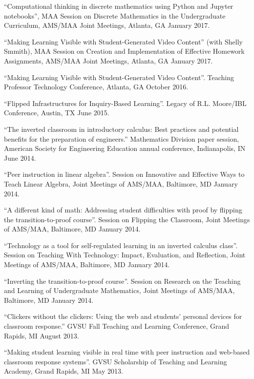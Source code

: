\documentclass[letterpaper]{article}
\renewenvironment{itemize}{
  \begin{list}{}{
    \setlength{\leftmargin}{1.5em}
	\setlength{\itemsep}{0in}
  }
}{
  \end{list}
}
\begin{document}
\begin{itemize}
  \item ``Computational thinking in discrete mathematics using Python and Jupyter notebooks'', MAA Session on Discrete Mathematics in the Undergraduate Curriculum, AMS/MAA Joint Meetings, Atlanta, GA January 2017.
  \item ``Making Learning Visible with Student-Generated Video Content'' (with Shelly Smmith), MAA Session on Creation and Implementation of Effective Homework Assignments, AMS/MAA Joint Meetings, Atlanta, GA January 2017.
	\item ``Making Learning Visible with Student-Generated Video Content''. Teaching Professor Technology Conference, Atlanta, GA October 2016.
	\item ``Flipped Infrastructures for Inquiry-Based Learning''. Legacy of R.L. Moore/IBL Conference, Austin, TX June 2015.
	\item ``The inverted classroom in introductory calculus: Best practices and potential benefits for the preparation of engineers.'' Mathematics Division paper session, American Society for Engineering Education annual conference, Indianapolis, IN June 2014.
	\item ``Peer instruction in linear algebra''. Session on Innovative and Effective Ways to Teach Linear Algebra, Joint Meetings of AMS/MAA, Baltimore, MD January 2014.
	\item ``A different kind of math: Addressing student difficulties with proof by flipping the transition-to-proof course''. Session on Flipping the Classroom, Joint Meetings of AMS/MAA, Baltimore, MD January 2014.
	\item ``Technology as a tool for self-regulated learning in an inverted calculus class''. Session on Teaching With Technology: Impact, Evaluation, and Reflection, Joint Meetings of AMS/MAA, Baltimore, MD January 2014.
	\item ``Inverting the transition-to-proof course''. Session on Research on the Teaching and Learning of Undergraduate Mathematics, Joint Meetings of AMS/MAA, Baltimore, MD January 2014.
	\item ``Clickers without the clickers: Using the web and students' personal devices for classroom response.'' GVSU Fall Teaching and Learning Conference, Grand Rapids, MI August 2013.
	\item ``Making student learning visible in real time with peer instruction and web-based classroom response systems''. GVSU Scholarship of Teaching and Learning Academy, Grand Rapids, MI May 2013.

\end{itemize}
\end{document}
